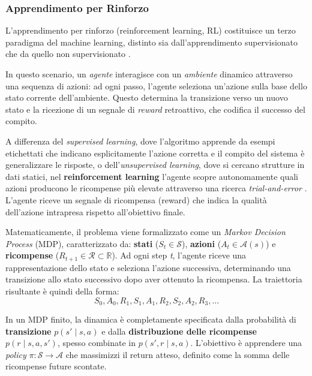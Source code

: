 \subsubsection{Apprendimento per Rinforzo}

L'apprendimento per rinforzo (reinforcement learning, RL) costituisce un terzo paradigma del machine learning, distinto sia dall'apprendimento supervisionato che da quello non supervisionato \cite{sutton2018reinforcement}. 

In questo scenario, un \textit{agente} interagisce con un \textit{ambiente} dinamico attraverso una sequenza di azioni: ad ogni passo, l'agente seleziona un'azione sulla base dello stato corrente dell'ambiente. Questo determina la transizione verso un nuovo stato e la ricezione di un segnale di \textit{reward} retroattivo, che codifica il successo del compito.

A differenza del \textit{supervised learning}, dove l'algoritmo apprende da esempi etichettati che indicano esplicitamente l'azione corretta e il compito del sistema è generalizzare le risposte, o dell'\textit{unsupervised learning}, dove si cercano strutture in dati statici, nel \textbf{reinforcement learning} l'agente scopre autonomamente quali azioni producono le ricompense più elevate attraverso una ricerca \textit{trial-and-error} \cite[pp.~1-6]{sutton2018reinforcement}. L'agente riceve un segnale di ricompensa (reward) che indica la qualità dell'azione intrapresa rispetto all'obiettivo finale.

Matematicamente, il problema viene formalizzato come un \textit{Markov Decision Process} (MDP), caratterizzato da: \textbf{stati} ($S_t \in \mathcal{S}$), \textbf{azioni} ($A_t \in \mathcal{A}(s)$) e \textbf{ricompense} ($R_{t+1} \in \mathcal{R} \subset \mathbb{R}$). Ad ogni step \textit{t}, l'agente riceve una rappresentazione dello stato e seleziona l'azione successiva, determinando una transizione allo stato successivo dopo aver ottenuto la ricompensa. 
La traiettoria risultante è quindi della forma:
\begin{equation}
S_0, A_0, R_1, S_1, A_1, R_2, S_2, A_2, R_3, \dots
\end{equation}

In un MDP finito, la dinamica è completamente specificata dalla probabilità di \textbf{transizione} $p(s' \mid s, a)$ e dalla \textbf{distribuzione delle ricompense} $p(r \mid s, a, s')$,
spesso combinate in $p(s', r \mid s, a)$.
L'obiettivo è apprendere una \textit{policy} $\pi: \mathcal{S} \rightarrow \mathcal{A}$ che massimizzi il return atteso, definito come la somma delle ricompense future scontate.

